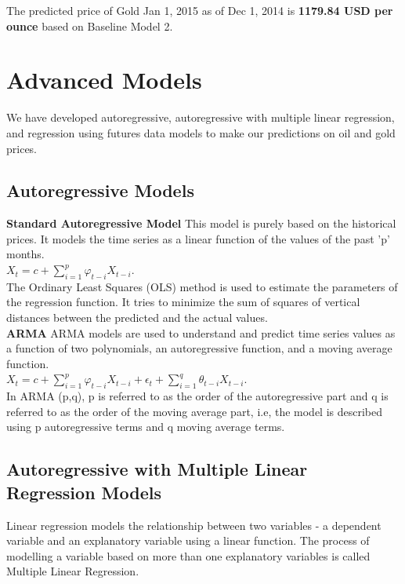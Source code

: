 \documentclass[runningheads]{llncs}
\begin{document}
\noindent The predicted price of Gold Jan 1, 2015 as of Dec 1, 2014 is 
\textbf{1179.84 USD per ounce} based on Baseline Model 2.\\

\section{Advanced Models}
We have developed autoregressive, autoregressive with multiple linear regression, and regression using futures data models to make our predictions on oil and gold prices. \\

\subsection{Autoregressive Models}
\noindent\textbf{Standard Autoregressive Model} This model is purely based on the historical prices. It models the time series as a linear function of the values of the past 'p' months.\\

$ X_{t} = c + \sum\limits_{i=1}^p \varphi_{t-i}X_{t-i}$. \\

\noindent The Ordinary Least Squares (OLS) method is used to estimate the parameters of the regression function. It tries to minimize the sum of squares of vertical distances between the predicted and the actual values. \\

\noindent\textbf{ARMA} ARMA models are used to understand and predict time series values as a function of two polynomials, an autoregressive function, and a moving average function. 
\\

$ X_{t} = c + \sum\limits_{i=1}^p \varphi_{t-i}X_{t-i} + \epsilon_{t} + \sum\limits_{i=1}^q \theta_{t-i}X_{t-i}$.\\

\noindent In ARMA (p,q), p is referred to as the order of the autoregressive part and q is referred to as the order of the moving average part, i.e, the model is described using p autoregressive terms and q moving average terms.\\ 

\subsection{Autoregressive with Multiple Linear Regression Models}
Linear regression models the relationship between two variables - a dependent variable and an explanatory variable using a linear function. The process of modelling a variable based on more than one explanatory variables is called Multiple Linear Regression. \\
   
\end{document}
